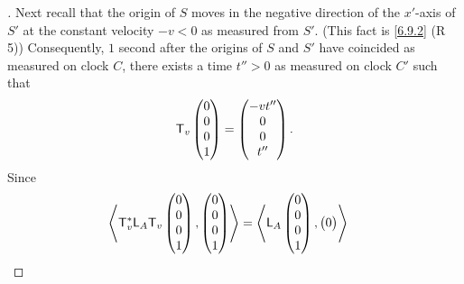 \begin{proof}[]
  Next recall that the origin of \(S\) moves in the negative direction of the \(x'\)-axis of \(S'\) at the constant velocity \(-v < 0\) as measured from \(S'\).
  (This fact is \cref{6.9.2} (R 5))
  Consequently, \(1\) second after the origins of \(S\) and \(S'\) have coincided as measured on clock \(C\), there exists a time \(t'' > 0\) as measured on clock \(C'\) such that
  \[
    \mathsf{T}_v\begin{pmatrix}
      0 \\
      0 \\
      0 \\
      1
    \end{pmatrix} = \begin{pmatrix}
      -v t'' \\
      0      \\
      0      \\
      t''
    \end{pmatrix}.
  \]
  Since
  \begin{align*}
    \left\langle\mathsf{T}_v^* \mathsf{L}_A \mathsf{T}_v\begin{pmatrix}
                             0 \\
                             0 \\
                             0 \\
                             1
                           \end{pmatrix}, \begin{pmatrix}
                                            0 \\
                                            0 \\
                                            0 \\
                                            1
                                          \end{pmatrix}\right\rangle & = \left\langle\mathsf{L}_A\begin{pmatrix}
                                                                        0 \\
                                                                        0 \\
                                                                        0 \\
                                                                        1
                                                                      \end{pmatrix}, \begin{pmatrix}
                                                                                       0 \\

\end{pmatrix}\right\rangle
\end{align*}
\end{proof}
